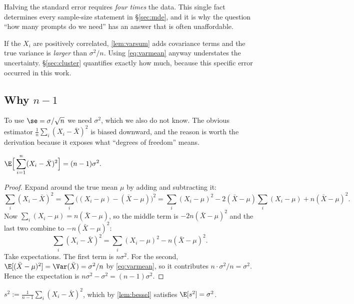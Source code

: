 \begin{remark}
Halving the standard error requires \emph{four times} the data. This single fact
determines every sample-size statement in §\ref{sec:mde}, and it is why the
question ``how many prompts do we need'' has an answer that is often unaffordable.
\end{remark}

\begin{remark}
If the $X_i$ are positively correlated, \cref{lem:varsum} adds covariance terms
and the true variance is \emph{larger} than $\sigma^2/n$. Using
\cref{eq:varmean} anyway understates the uncertainty. §\ref{sec:cluster}
quantifies exactly how much, because this specific error occurred in this work.
\end{remark}

\subsection{Why $n-1$}

To use $\se = \sigma/\sqrt n$ we need $\sigma^2$, which we also do not know. The
obvious estimator $\frac1n\sum_i(X_i-\bar X)^2$ is biased downward, and the
reason is worth the derivation because it exposes what ``degrees of freedom''
means.

\begin{lemma}
\label{lem:bessel}
$\displaystyle \E\Big[\sum_{i=1}^n (X_i-\bar X)^2\Big] = (n-1)\sigma^2.$
\end{lemma}
\begin{proof}
Expand around the true mean $\mu$ by adding and subtracting it:
\[
\sum_i (X_i-\bar X)^2 = \sum_i \big((X_i-\mu)-(\bar X-\mu)\big)^2
= \sum_i (X_i-\mu)^2 - 2(\bar X-\mu)\sum_i (X_i-\mu) + n(\bar X-\mu)^2 .
\]
Now $\sum_i (X_i-\mu) = n(\bar X - \mu)$, so the middle term is
$-2n(\bar X-\mu)^2$ and the last two combine to $-n(\bar X-\mu)^2$:
\[
\sum_i (X_i-\bar X)^2 = \sum_i (X_i-\mu)^2 - n(\bar X-\mu)^2 .
\]
Take expectations. The first term is $n\sigma^2$. For the second,
$\E[(\bar X-\mu)^2] = \Var(\bar X) = \sigma^2/n$ by \cref{eq:varmean}, so it
contributes $n \cdot \sigma^2/n = \sigma^2$. Hence the expectation is
$n\sigma^2 - \sigma^2 = (n-1)\sigma^2$.
\end{proof}

\begin{definition}
$\displaystyle s^2 := \frac{1}{n-1}\sum_i (X_i-\bar X)^2$, which by
\cref{lem:bessel} satisfies $\E[s^2]=\sigma^2$.
\end{definition}

